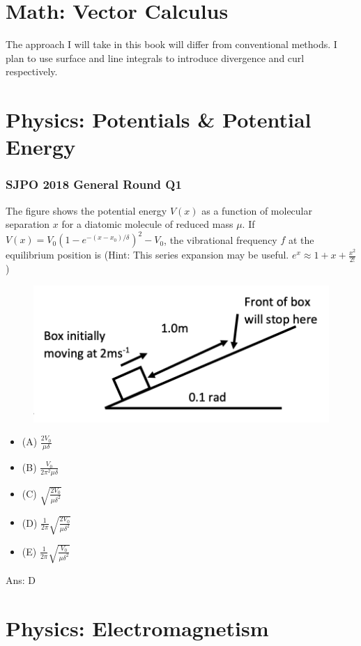 \documentclass{article}
\begin{document}
\section{Math: Vector Calculus}
\noindent The approach I will take in this book will differ from conventional methods. I plan to use surface and line integrals to introduce divergence and curl respectively. 
\clearpage
\section{Physics: Potentials \& Potential Energy}
\subsubsection{SJPO 2018 General Round Q1}
The figure shows the potential energy $V(x)$ as a function of molecular separation $x$ for a diatomic molecule of reduced mass $\mu$.
If $V(x)=V_0\left(1-e^{-\left(x-x_0\right)/\delta}\right)^2-V_0$, the vibrational frequency $f$ at the equilibrium position is
(Hint: This series expansion may be useful. $e^x \approx 1+x+\frac{x^2}{2 !}$ ) \\
\begin{figure}
\includegraphics[width=1.0\linewidth]{images/sjpo2016q4.png}
\end{figure}
\begin{itemize}
\item[] (A) $\frac{2 V_0}{\mu \delta}$
\item[] (B) $\frac{V_0}{2 \pi^2 \mu \delta}$
\item[] (C) $\sqrt{\frac{2 V_0}{\mu \delta^2}}$
\item[] (D) $\frac{1}{2 \pi} \sqrt{\frac{2 V_0}{\mu \delta^2}}$
\item[] (E) $\frac{1}{2 \pi} \sqrt{\frac{V_0}{\mu \delta^2}}$
\end{itemize}
Ans: \ifpaper D \fi
\clearpage
\section{Physics: Electromagnetism}
\end{document}
